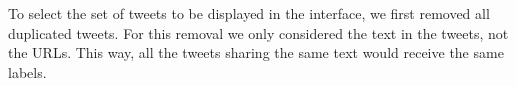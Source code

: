 

  

  
  
  
  
  


To select the set of tweets to be displayed in the interface, we first removed
all duplicated tweets.
%
For this removal we only considered the text in the tweets, not the URLs.
%
This way, all the tweets sharing the same text would receive the same labels.
% 


